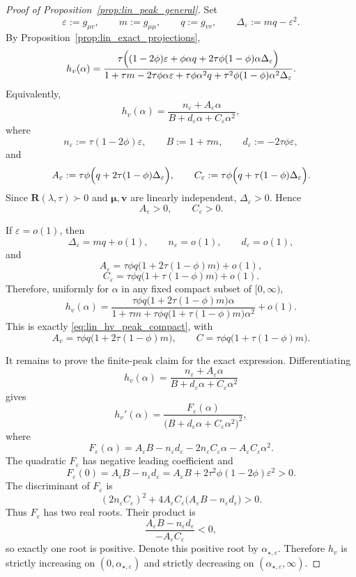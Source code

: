 \documentclass[11pt]{article}
\newcommand{\bv}{\mathbf{v}}
\newcommand{\bmu}{\boldsymbol{\mu}}
\begin{document}
\begin{proof}[Proof of Proposition~\ref{prop:lin_peak_general}]
Set
\[
\varepsilon:=g_{\mu v},
\qquad
m:=g_{\mu\mu},
\qquad
q:=g_{vv},
\qquad
\Delta_\varepsilon:=mq-\varepsilon^2.
\]
By Proposition~\ref{prop:lin_exact_projections},
\[
h_v(\alpha)
=
\frac{
\tau\Bigl((1-2\phi)\varepsilon
+\phi\alpha q
+2\tau\phi(1-\phi)\alpha\Delta_\varepsilon\Bigr)
}
{
1+\tau m
-2\tau\phi\alpha\varepsilon
+\tau\phi\alpha^2q
+\tau^2\phi(1-\phi)\alpha^2\Delta_\varepsilon
}.
\]
Equivalently,
\[
h_v(\alpha)
=
\frac{n_\varepsilon+A_\varepsilon\alpha}
{B+d_\varepsilon\alpha+C_\varepsilon\alpha^2},
\]
where
\[
n_\varepsilon:=\tau(1-2\phi)\varepsilon,
\qquad
B:=1+\tau m,
\qquad
d_\varepsilon:=-2\tau\phi\varepsilon,
\]
and
\[
A_\varepsilon
:=
\tau\phi\Bigl(q+2\tau(1-\phi)\Delta_\varepsilon\Bigr),
\qquad
C_\varepsilon
:=
\tau\phi\Bigl(q+\tau(1-\phi)\Delta_\varepsilon\Bigr).
\]
Since \(\mathbf{R}(\lambda,\tau)\succ0\) and \(\bmu,\bv\) are linearly independent,
\(\Delta_\varepsilon>0\). Hence
\[
A_\varepsilon>0,
\qquad
C_\varepsilon>0.
\]

If \(\varepsilon=o(1)\), then
\[
\Delta_\varepsilon=mq+o(1),
\qquad
n_\varepsilon=o(1),
\qquad
d_\varepsilon=o(1),
\]
and
\[
A_\varepsilon
=
\tau\phi q\bigl(1+2\tau(1-\phi)m\bigr)+o(1),
\]
\[
C_\varepsilon
=
\tau\phi q\bigl(1+\tau(1-\phi)m\bigr)+o(1).
\]
Therefore, uniformly for \(\alpha\) in any fixed compact subset of
\([0,\infty)\),
\[
h_v(\alpha)
=
\frac{
\tau\phi q\bigl(1+2\tau(1-\phi)m\bigr)\alpha
}
{
1+\tau m+
\tau\phi q\bigl(1+\tau(1-\phi)m\bigr)\alpha^2
}
+o(1).
\]
This is exactly \eqref{eq:lin_hv_peak_compact}, with
\[
A_v=\tau\phi q\bigl(1+2\tau(1-\phi)m\bigr),
\qquad
C=\tau\phi q\bigl(1+\tau(1-\phi)m\bigr).
\]

It remains to prove the finite-peak claim for the exact expression.
Differentiating
\[
h_v(\alpha)
=
\frac{n_\varepsilon+A_\varepsilon\alpha}
{B+d_\varepsilon\alpha+C_\varepsilon\alpha^2}
\]
gives
\[
h_v'(\alpha)
=
\frac{
F_\varepsilon(\alpha)
}
{
\bigl(B+d_\varepsilon\alpha+C_\varepsilon\alpha^2\bigr)^2
},
\]
where
\[
F_\varepsilon(\alpha)
=
A_\varepsilon B
-
n_\varepsilon d_\varepsilon
-
2n_\varepsilon C_\varepsilon\alpha
-
A_\varepsilon C_\varepsilon\alpha^2.
\]
The quadratic \(F_\varepsilon\) has negative leading coefficient and
\[
F_\varepsilon(0)
=
A_\varepsilon B-n_\varepsilon d_\varepsilon
=
A_\varepsilon B
+
2\tau^2\phi(1-2\phi)\varepsilon^2
>0.
\]
The discriminant of \(F_\varepsilon\) is
\[
(2n_\varepsilon C_\varepsilon)^2
+
4A_\varepsilon C_\varepsilon
\bigl(A_\varepsilon B-n_\varepsilon d_\varepsilon\bigr)
>0.
\]
Thus \(F_\varepsilon\) has two real roots. Their product is
\[
\frac{
A_\varepsilon B-n_\varepsilon d_\varepsilon
}
{
-A_\varepsilon C_\varepsilon
}
<0,
\]
so exactly one root is positive. Denote this positive root by
\(\alpha_{\star,\varepsilon}\). Therefore \(h_v\) is strictly increasing on
\((0,\alpha_{\star,\varepsilon})\) and strictly decreasing on
\((\alpha_{\star,\varepsilon},\infty)\).


\end{proof}
\end{document}
